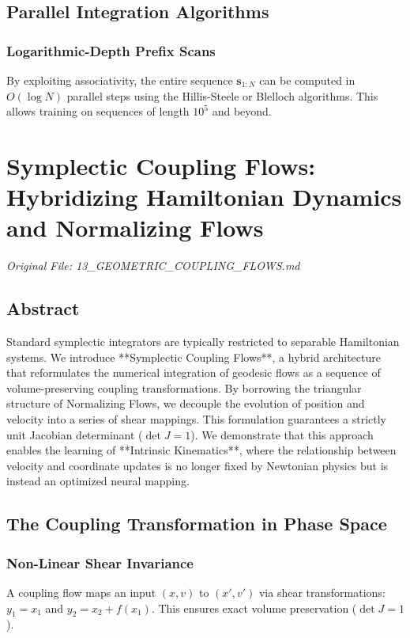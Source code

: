 \documentclass[11pt,a4paper]{report}
\begin{document}
\section{Parallel Integration Algorithms}

\subsection{Logarithmic-Depth Prefix Scans}
By exploiting associativity, the entire sequence $\mathbf{s}_{1:N}$ can be computed in $O(\log N)$ parallel steps using the Hillis-Steele or Blelloch algorithms. This allows training on sequences of length $10^5$ and beyond.

\chapter{Symplectic Coupling Flows: Hybridizing Hamiltonian Dynamics and Normalizing Flows}
\textit{Original File: 13\_GEOMETRIC\_COUPLING\_FLOWS.md}

\section{Abstract}
Standard symplectic integrators are typically restricted to separable Hamiltonian systems. We introduce **Symplectic Coupling Flows**, a hybrid architecture that reformulates the numerical integration of geodesic flows as a sequence of volume-preserving coupling transformations. By borrowing the triangular structure of Normalizing Flows, we decouple the evolution of position and velocity into a series of shear mappings. This formulation guarantees a strictly unit Jacobian determinant ($\det J = 1$). We demonstrate that this approach enables the learning of **Intrinsic Kinematics**, where the relationship between velocity and coordinate updates is no longer fixed by Newtonian physics but is instead an optimized neural mapping.

\section{The Coupling Transformation in Phase Space}

\subsection{Non-Linear Shear Invariance}
A coupling flow maps an input $(x, v)$ to $(x', v')$ via shear transformations: $y_1 = x_1$ and $y_2 = x_2 + f(x_1)$. This ensures exact volume preservation ($\det J = 1$).
\end{document}
